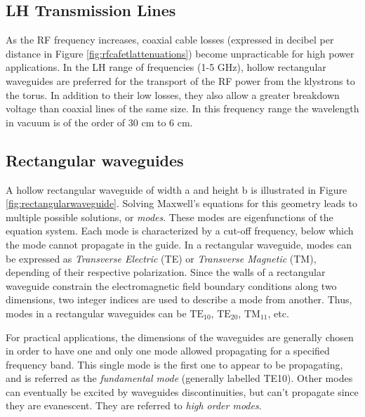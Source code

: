 \subsection{LH Transmission Lines}
As the RF frequency increases, coaxial cable losses (expressed in decibel per distance in Figure \ref{fig:rfcafetlattenuations}) become unpracticable for high power applications. In the LH range of frequencies (1-5 GHz), hollow rectangular waveguides are preferred for the transport of the RF power from the klystrons to the torus. In addition to their low losses, they also allow a greater breakdown voltage than coaxial lines of the same size. In this frequency range the wavelength in vacuum is of the order of 30 cm to 6 cm.




\subsection{Rectangular waveguides} 
A hollow rectangular waveguide of width a and height b is illustrated in Figure \ref{fig:rectangularwaveguide}. Solving Maxwell’s equations for this geometry leads to multiple possible solutions, or \emph{modes}. These modes are eigenfunctions of the equation system. Each mode is characterized by a cut-off frequency, below which the mode cannot propagate in the guide. In a rectangular waveguide, modes can be expressed as \emph{Transverse Electric} (TE) or \emph{Transverse Magnetic} (TM), depending of their respective polarization. Since the walls of a rectangular waveguide constrain the electromagnetic field boundary conditions along two dimensions, two integer indices are used to describe a mode from another. Thus, modes in a rectangular waveguides can be $\mathrm{TE}_{10}$, $\mathrm{TE}_{20}$, $\mathrm{TM}_{11}$, etc. 

For practical applications, the dimensions of the waveguides are generally chosen in order to have one and only one mode allowed propagating for a specified frequency band. This single mode is the first one to appear to be propagating, and is referred as the \textit{fundamental mode} (generally labelled TE10). Other modes can eventually be excited by waveguides discontinuities, but can’t propagate since they are evanescent. They are referred to \textit{high order modes}.

